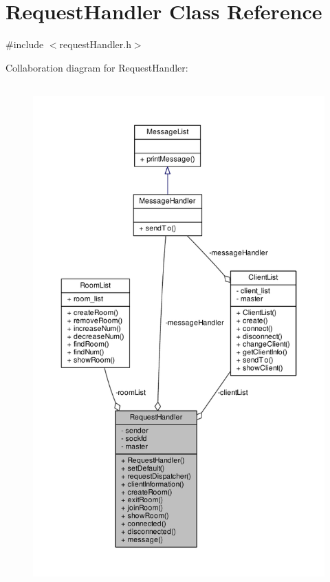 \hypertarget{class_request_handler}{}\section{Request\+Handler Class Reference}
\label{class_request_handler}


{\ttfamily \#include $<$request\+Handler.\+h$>$}



Collaboration diagram for Request\+Handler\+:
\nopagebreak
\begin{figure}[H]
\begin{center}
\leavevmode
\includegraphics[height=550pt]{class_request_handler__coll__graph}
\end{center}
\end{figure}
